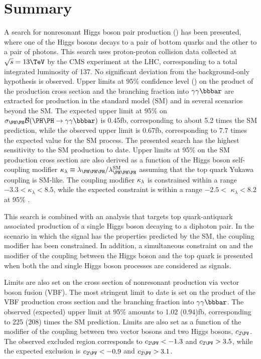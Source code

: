 \documentclass[11pt,twoside,a4paper,cmspaper,final,collab]{cms-tdr}
\begin{document}
\section{Summary}\label{sec:sum}

A search for nonresonant Higgs boson pair production (\HH) has been presented, where one of the Higgs bosons decays to a pair of bottom quarks and the other to a pair of photons. This search uses 
proton-proton collision data collected at $\sqrt{s} = 13\TeV$ by the CMS
experiment at the LHC, corresponding to a total integrated luminosity
of 137\fbinv. No significant deviation from the background-only hypothesis is observed.
Upper limits at 95\% confidence level (\CL) on the product of the \HH production cross section and the branching fraction into $\bbgg$ are extracted for production in the standard model
(SM) and in several scenarios beyond the SM. 
The expected upper limit at 95\% \CL on $\sigmaHH \BR$ is 0.45\unit{fb}, corresponding to about 5.2 times the SM prediction, while the observed upper limit is 0.67\unit{fb}, corresponding to 7.7 times the expected value for the SM process. The presented search has the highest sensitivity to the SM \HH production to date. Upper limits at 95\% \CL on the SM \HH production cross section are also derived as a function of the Higgs boson self-coupling modifier $\kapl \equiv \lbdHHH/\lbdSM$ assuming that the top quark Yukawa coupling is SM-like. The coupling modifier $\kappa_{\lambda}$ is constrained within a range $-3.3<\kappa_{\lambda}< 8.5$, while the expected constraint is within a range $-2.5<$ $\kappa_{\lambda}<8.2$ at 95\% \CL.


This search is combined with an analysis that targets top quark-antiquark associated production of a single Higgs boson decaying to a diphoton pair.
In the scenario in which the \HH signal has the properties predicted by the SM, the coupling modifier \kapl has been constrained. 
In addition, a simultaneous constraint on \kapl and the modifier of the coupling between the Higgs boson and the top quark \kapt is presented when both the \HH and single Higgs boson processes are considered as signals.

Limits are also set on the cross section of
nonresonant \HH production via vector boson fusion (VBF). 
The most stringent limit to date is set on the product of the \HH VBF production cross section and the branching fraction into $\bbgg$. The observed (expected) upper limit at 95\% \CL amounts to 1.02 (0.94)\unit{fb}, corresponding to 225 (208) times the SM prediction.
Limits are also set as a function of the modifier of the coupling between two vector bosons and two Higgs bosons, $\ctwov$. 
 The observed excluded region
corresponds to $\ctwov < -1.3$ and $\ctwov > 3.5$, while the expected exclusion is $\ctwov < -0.9$ and $\ctwov > 3.1$.
\end{document}
